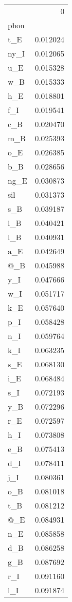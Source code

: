 \begin{tabular}{lr}
\toprule
{} &         0 \\
phon &           \\
\midrule
t\_E  &  0.012024 \\
ny\_I &  0.012065 \\
u\_E  &  0.015328 \\
w\_B  &  0.015333 \\
h\_E  &  0.018801 \\
f\_I  &  0.019541 \\
c\_B  &  0.020470 \\
m\_B  &  0.025393 \\
o\_E  &  0.026385 \\
b\_B  &  0.028656 \\
ng\_E &  0.030873 \\
sil  &  0.031373 \\
s\_B  &  0.039187 \\
i\_B  &  0.040421 \\
l\_B  &  0.040931 \\
a\_E  &  0.042649 \\
@\_B  &  0.045988 \\
y\_I  &  0.047666 \\
w\_I  &  0.051717 \\
k\_E  &  0.057640 \\
p\_I  &  0.058428 \\
n\_I  &  0.059764 \\
k\_I  &  0.063235 \\
s\_E  &  0.068130 \\
i\_E  &  0.068484 \\
s\_I  &  0.072193 \\
y\_B  &  0.072296 \\
r\_E  &  0.072597 \\
h\_I  &  0.073808 \\
e\_B  &  0.075413 \\
d\_I  &  0.078411 \\
j\_I  &  0.080361 \\
o\_B  &  0.081018 \\
t\_B  &  0.081212 \\
@\_E  &  0.084931 \\
n\_E  &  0.085858 \\
d\_B  &  0.086258 \\
g\_B  &  0.087692 \\
r\_I  &  0.091160 \\
l\_I  &  0.091874 \\

\end{tabular}
